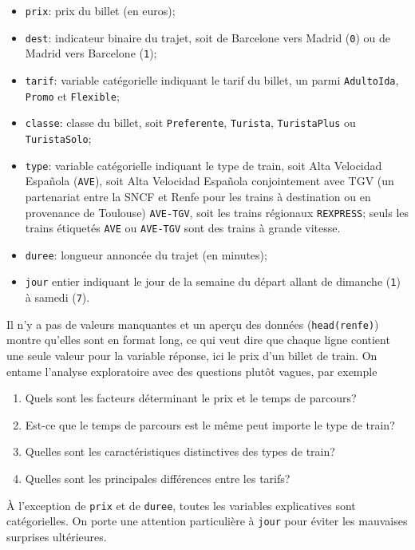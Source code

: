 \documentclass[
  11pt,
  letterpaper,
]{article}
\providecommand{\tightlist}{%
  \setlength{\itemsep}{0pt}\setlength{\parskip}{0pt}}
\theoremstyle{definition}
\theoremstyle{definition}
\theoremstyle{definition}
\theoremstyle{definition}
\theoremstyle{remark}
\begin{document}
\begin{itemize}
\tightlist
\item
  \texttt{prix}: prix du billet (en euros);
\item
  \texttt{dest}: indicateur binaire du trajet, soit de Barcelone vers Madrid (\texttt{0}) ou de Madrid vers Barcelone (\texttt{1});
\item
  \texttt{tarif}: variable catégorielle indiquant le tarif du billet, un parmi \texttt{AdultoIda}, \texttt{Promo} et \texttt{Flexible};
\item
  \texttt{classe}: classe du billet, soit \texttt{Preferente}, \texttt{Turista}, \texttt{TuristaPlus} ou \texttt{TuristaSolo};
\item
  \texttt{type}: variable catégorielle indiquant le type de train, soit Alta Velocidad Española (\texttt{AVE}), soit Alta Velocidad Española conjointement avec TGV (un partenariat entre la SNCF et Renfe pour les trains à destination ou en provenance de Toulouse) \texttt{AVE-TGV}, soit les trains régionaux \texttt{REXPRESS}; seuls les trains étiquetés \texttt{AVE} ou \texttt{AVE-TGV} sont des trains à grande vitesse.
\item
  \texttt{duree}: longueur annoncée du trajet (en minutes);
\item
  \texttt{jour} entier indiquant le jour de la semaine du départ allant de dimanche (\texttt{1}) à samedi (\texttt{7}).
\end{itemize}

Il n'y a pas de valeurs manquantes et un aperçu des données (\texttt{head(renfe)}) montre qu'elles sont en format long, ce qui veut dire que chaque ligne contient une seule valeur pour la variable réponse, ici le prix d'un billet de train. On entame l'analyse exploratoire avec des questions plutôt vagues, par exemple

\begin{enumerate}
\def\labelenumi{\arabic{enumi}.}
\tightlist
\item
  Quels sont les facteurs déterminant le prix et le temps de parcours?
\item
  Est-ce que le temps de parcours est le même peut importe le type de train?
\item
  Quelles sont les caractéristiques distinctives des types de train?
\item
  Quelles sont les principales différences entre les tarifs?
\end{enumerate}

À l'exception de \texttt{prix} et de \texttt{duree}, toutes les variables explicatives sont catégorielles. On porte une attention particulière à \texttt{jour} pour éviter les mauvaises surprises ultérieures.
\end{document}
